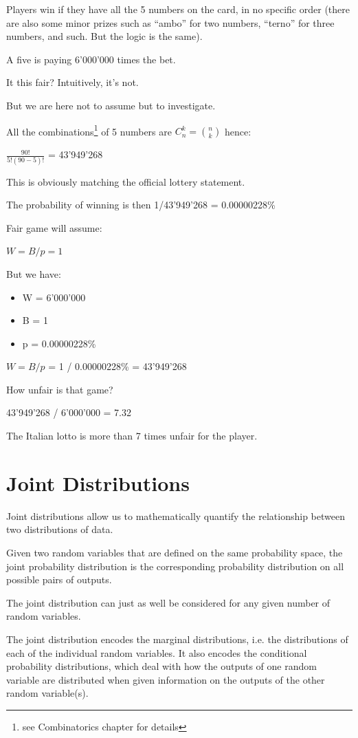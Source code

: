 \documentclass{article}
\begin{document}
Players win if they have all the 5 numbers on the card, in no specific order (there are also some minor prizes such as “ambo” for two numbers, “terno” for three numbers, and such. But the logic is the same).

A five is paying 6’000’000 times the bet.

It this fair? Intuitively, it’s not. 

But we are here not to assume but to investigate.

All the combinations\footnote{see Combinatorics chapter for details} of 5 numbers are $ \displaystyle C _n ^k = \binom{n}{k}$ hence:

$\frac{90!}{5!(90 - 5)!}$ = 43’949’268 

This is obviously matching the official lottery statement.

The probability of winning is then 1/43’949’268 = 0.00000228\%

Fair game will assume: 

$W = B/p = 1$

But we have:
\begin{itemize}
    \item W = 6’000’000
    \item B = 1
    \item p = 0.00000228\%
\end{itemize}

$W = B/p$ = 1 / 0.00000228\% = 43’949’268

How unfair is that game?

43’949’268 / 6’000’000 = 7.32

The Italian lotto is more than 7 times unfair for the player.
\clearpage

\section{Joint Distributions}
Joint distributions allow us to mathematically quantify the relationship between two distributions of data. 

Given two random variables that are defined on the same probability space, the joint probability distribution is the corresponding probability distribution on all possible pairs of outputs. 

The joint distribution can just as well be considered for any given number of random variables. 

The joint distribution encodes the marginal distributions, i.e. the distributions of each of the individual random variables. It also encodes the conditional probability distributions, which deal with how the outputs of one random variable are distributed when given information on the outputs of the other random variable(s).
\end{document}
